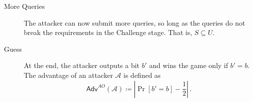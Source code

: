 \documentclass[twocolumn]{autart}
\begin{document}
\begin{description}
\begin{equation*}
    \end{equation*}
    \item[More Queries] The attacker can now submit more queries, so long as the queries do not break the requirements in the Challenge stage. That is, $S \subseteq U$.
    \item[Guess] At the end, the attacker outputs a bit $b'$ and wins the game only if $b' = b$. The advantage of an attacker $\mathcal{A}$ is defined as
    \begin{equation*}
        \mathsf{Adv}^{AO}(\mathcal{A}) \coloneqq \left\lvert \Pr [b'=b] - \frac{1}{2}\right\rvert\,.
    \end{equation*} 
\end{description}
\end{document}
